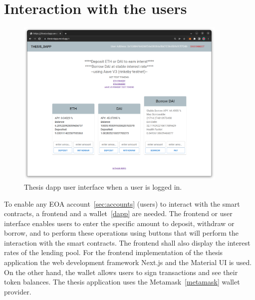 \documentclass[11pt,a4paper]{report}
\begin{document}
\section{Interaction with the users}
\begin{figure}
	\centering
	\includegraphics[width=0.90\textwidth]{./images/thesis-dapp}
	\caption{Thesis dapp user interface when a user is logged in.}
	\label{fig:tdapp}
\end{figure}
To enable any EOA account~\ref{sec:accounts} (users) to interact with the smart contracts, a frontend and a wallet~\ref{dapp} are needed. The frontend or user interface enables users to enter the specific amount to deposit, withdraw or borrow, and to perform these operations using buttons that will perform the interaction with the smart contracts. The frontend shall also display the interest rates of the lending pool. For the frontend implementation of the thesis application the web development framework Next.js\cite{nextjs} and the Material UI\cite{mui} is used. On the other hand, the wallet allows users to sign transactions and see their token balances. The thesis application uses the Metamask~\ref{metamask} wallet provider.
\end{document}
